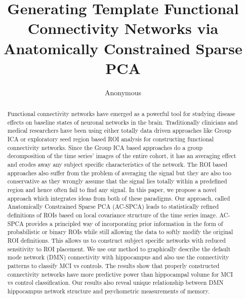 \documentclass{llncs}
\begin{document}
\vspace{-0.1in}
\title{Generating Template Functional Connectivity Networks via Anatomically Constrained Sparse PCA}
\author{Anonymous}
\maketitle              
\begin{abstract}
 Functional connectivity networks have emerged as a powerful tool for studying disease effects on baseline states of neuronal networks in the brain. Traditionally clinicians and medical researchers have been using either totally data driven approaches like Group ICA or exploratory seed region based ROI analysis for constructing functional connectivity networks. Since the Group ICA based approaches do a group decomposition of the time series' images of the entire cohort, it has an averaging effect and erodes away any subject specific characteristics of the network. The ROI based approaches also suffer from the problem of averaging the signal but they are also too conservative as they wrongly assume that the signal lies totally within a predefined region and hence often fail to find any signal. In this paper, we propose a novel approach which integrates ideas from both of these paradigms. Our approach, called Anatomically Constrained Sparse PCA (AC-SPCA) leads to statistically refined definitions of ROIs based on local covariance structure of the time series image. AC-SPCA provides a principled way of incorporating prior information in the form of probabilistic or binary ROIs while still allowing the data to softly modify the original ROI definitions. This allows us to construct subject specific networks with reduced sensitivity to ROI placement. We use our method to graphically describe the default mode network (DMN) connectivity with hippocampus and also use the connectivity patterns to classify MCI vs controls. The results show that properly constructed connectivity networks have more predictive power than hippocampal volume for MCI vs control classification.  Our results also reveal unique relationship between DMN hippocampus network structure and psychometric measurements of memory.

\end{abstract}
\end{document}
